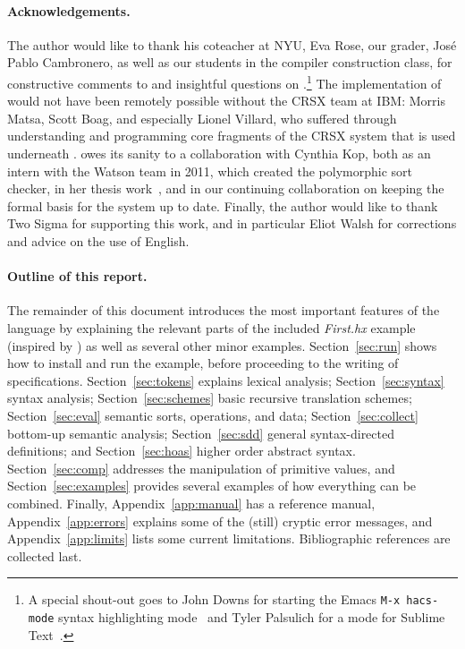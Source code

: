 \documentclass[11pt]{article} %
\begin{document}
\paragraph*{Acknowledgements.}

The author would like to thank his coteacher at NYU, Eva Rose, our grader, José Pablo Cambronero, as
well as our students in the compiler construction class, for constructive comments to and insightful
questions on \HAX.\footnote{A special shout-out goes to John Downs for starting the Emacs
  \texttt{M-x hacs-mode} syntax highlighting mode~\cite{git:hacsel} and Tyler Palsulich for a \HAX
  mode for Sublime Text~\cite{git:hacs-sublime}.}
The implementation of \HAX would not have been remotely possible without the CRSX team at IBM:
Morris Matsa, Scott Boag, and especially Lionel Villard, who suffered through understanding and
programming core fragments of the CRSX system that is used underneath \HAX.
\HAX owes its sanity to a collaboration with Cynthia Kop, both as an intern with the Watson team in
2011, which created the polymorphic sort checker, in her thesis work~\cite{Kop:2012}, and in our
continuing collaboration on keeping the formal basis for the system up to date.
Finally, the author would like to thank Two Sigma for supporting this work, and in particular Eliot
Walsh for corrections and advice on the use of English.

\paragraph*{Outline of this report.}

The remainder of this document introduces the most important features of the \HAX language by
explaining the relevant parts of the included \emph{First.hx} example (inspired by
\cite[Figure~1.7]{Aho+:2006}) as well as several other minor examples.
Section~\ref{sec:run} shows how to install \HAX and run the example, before proceeding to
the writing of specifications. %
Section~\ref{sec:tokens} explains lexical analysis; %
Section~\ref{sec:syntax} syntax analysis; %
Section~\ref{sec:schemes} basic recursive translation schemes; %
Section~\ref{sec:eval} semantic sorts, operations, and data; %
Section~\ref{sec:collect} bottom-up semantic analysis; %
Section~\ref{sec:sdd} general syntax-directed definitions; %
and Section~\ref{sec:hoas} higher order abstract syntax. %
Section~\ref{sec:comp} addresses the manipulation of primitive values, %
and Section~\ref{sec:examples} provides several examples of how everything can be combined.
Finally, %
Appendix~\ref{app:manual} has a reference manual, %
Appendix~\ref{app:errors} explains some of the (still) cryptic error messages, %
and Appendix~\ref{app:limits} lists some current limitations.
Bibliographic references are collected last.
\end{document}
